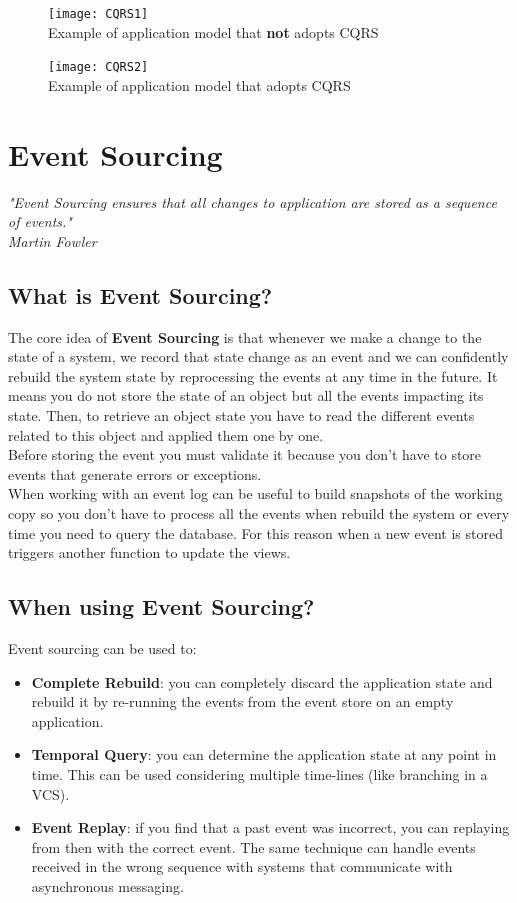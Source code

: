 \documentclass[11pt]{article} %
\begin{document}
\begin{figure} [H]
  \centering
  \texttt{[image: CQRS1]} \\
  Example of application model that \textbf{not} adopts CQRS
\end{figure}
\begin{figure} [H]
  \centering
  \texttt{[image: CQRS2]} \\
  Example of application model that adopts CQRS \\
\end{figure} 
\newpage
\section{Event Sourcing} 
\begin{center}
	\emph{"Event Sourcing ensures that all changes to application are stored as a sequence of events."  \\Martin Fowler} \\
\end{center}

\subsection{What is Event Sourcing?}
The core idea of \textbf{Event Sourcing} is that whenever we make a change to the state of a system, we record that state change as an event and we can confidently rebuild the system state by reprocessing the events at any time in the future. It means you do not store the state of an object but all the events impacting its state. Then, to retrieve an object state you have to read the different events related to this object and applied them one by one.
\\
Before storing the event you must validate it because you don't have to store events that generate errors or exceptions.\\ 
When working with an event log can be useful to build snapshots of the working copy so you don't have to process all the events when rebuild the system or every time you need to query the database. For this reason when a new event is stored triggers another function to update the views.

\subsection{When using Event Sourcing?}
Event sourcing can be used to:
\begin{itemize}
	\item \textbf{Complete Rebuild}: you can completely discard the application state  and rebuild it by re-running the events from the event store on an empty application.
	\item \textbf{Temporal Query}: you can determine the application state at any point in time. This can be used considering multiple time-lines (like branching in a VCS).
	\item \textbf{Event Replay}: if you find that a past event was incorrect, you can replaying from then with the correct event. The same technique can handle events received in the wrong sequence with systems that communicate with asynchronous messaging.
\end{itemize}
\end{document}
